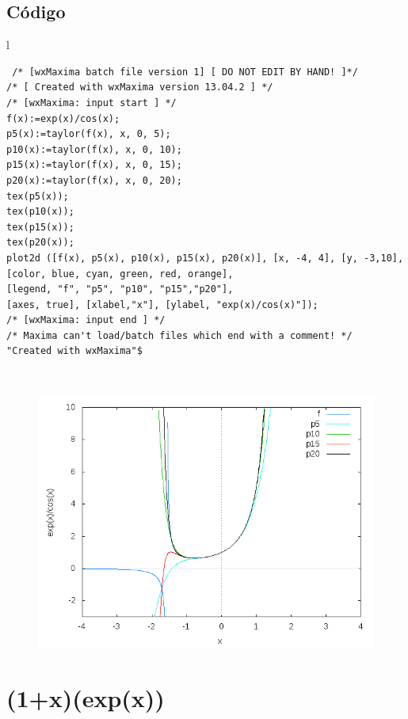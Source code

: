 \documentclass[10pt]{article}
\begin{document}
\subsection{Código}
\begin{tabular}{l}
\begin{verbatim}  
 /* [wxMaxima batch file version 1] [ DO NOT EDIT BY HAND! ]*/
/* [ Created with wxMaxima version 13.04.2 ] */
/* [wxMaxima: input start ] */
f(x):=exp(x)/cos(x);
p5(x):=taylor(f(x), x, 0, 5);
p10(x):=taylor(f(x), x, 0, 10);
p15(x):=taylor(f(x), x, 0, 15);
p20(x):=taylor(f(x), x, 0, 20);
tex(p5(x));
tex(p10(x));
tex(p15(x));
tex(p20(x));
plot2d ([f(x), p5(x), p10(x), p15(x), p20(x)], [x, -4, 4], [y, -3,10],
[color, blue, cyan, green, red, orange],
[legend, "f", "p5", "p10", "p15","p20"],
[axes, true], [xlabel,"x"], [ylabel, "exp(x)/cos(x)"]);
/* [wxMaxima: input end ] */
/* Maxima can't load/batch files which end with a comment! */
"Created with wxMaxima"$ 
\end{verbatim} \\
\begin{figure}
  \centering
    \includegraphics[scale=0.4]{expcos}
\end{figure}
\end{tabular}


\newpage


\section{(1+x)(exp(x))}
\end{document}
